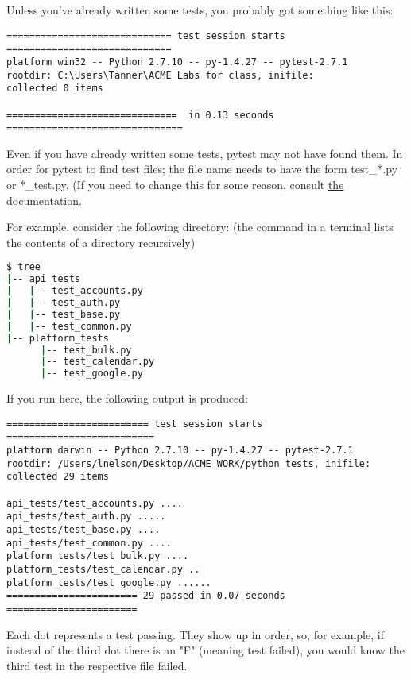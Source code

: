 Unless you've already written some tests, you probably got something like this:

\begin{lstlisting}
============================= test session starts =============================
platform win32 -- Python 2.7.10 -- py-1.4.27 -- pytest-2.7.1
rootdir: C:\Users\Tanner\ACME Labs for class, inifile:
collected 0 items

==============================  in 0.13 seconds ===============================
\end{lstlisting}


Even if you have already written some tests, pytest may not have found them.  In order for pytest to find test files; the file name needs to have the form test\_*.py or *\_test.py.  (If you need to change this for some reason, consult \href{http://pytest.org/latest/example/pythoncollection.html} {the documentation}.


For example, consider the following directory: (the  command in a terminal lists the contents of a directory recursively)
\begin{lstlisting}[language=bash]
$ tree
|-- api_tests
|   |-- test_accounts.py
|   |-- test_auth.py
|   |-- test_base.py
|   |-- test_common.py
|-- platform_tests
      |-- test_bulk.py
      |-- test_calendar.py
      |-- test_google.py
\end{lstlisting}

If you run  here, the following output is produced:

\begin{lstlisting}
========================= test session starts ==========================
platform darwin -- Python 2.7.10 -- py-1.4.27 -- pytest-2.7.1
rootdir: /Users/lnelson/Desktop/ACME_WORK/python_tests, inifile:
collected 29 items

api_tests/test_accounts.py ....
api_tests/test_auth.py .....
api_tests/test_base.py ....
api_tests/test_common.py ....
platform_tests/test_bulk.py ....
platform_tests/test_calendar.py ..
platform_tests/test_google.py ......
======================= 29 passed in 0.07 seconds =======================
\end{lstlisting}
\begin{info}
Each dot represents a test passing. They show up in order, so, for example, if instead of the third dot there is an "F" (meaning test failed), you would know the third test in the respective file failed.
\end{info}

